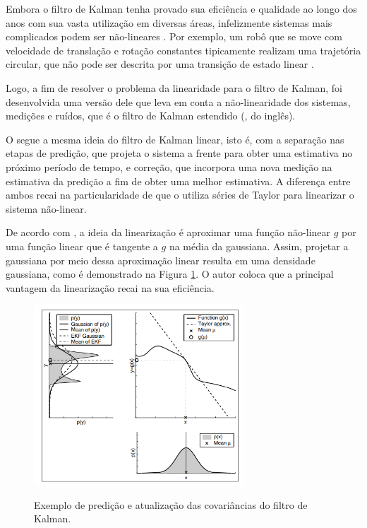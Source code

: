 \documentclass[acronym, symbols, table, deposito]{fei}
\begin{document}
			Embora o filtro de Kalman tenha provado sua eficiência e qualidade ao longo dos anos com sua vasta utilização em diversas áreas, infelizmente sistemas mais complicados podem ser não-lineares \cite{khodarahmi2023review}. Por exemplo, um robô que se move com velocidade de translação e rotação constantes tipicamente realizam uma trajetória circular, que não pode ser descrita por uma transição de estado linear \cite{thrun2002probabilistic}.
			
			Logo, a fim de resolver o problema da linearidade para o filtro de Kalman, foi desenvolvida uma versão dele que leva em conta a não-linearidade dos sistemas, medições e ruídos, que é o filtro de Kalman estendido (, do inglês).
			
			O  segue a mesma ideia do filtro de Kalman linear, isto é, com a separação nas etapas de predição, que projeta o sistema a frente para obter uma estimativa no próximo período de tempo, e correção, que incorpora uma nova medição na estimativa da predição a fim de obter uma melhor estimativa. A diferença entre ambos recai na particularidade de que o  utiliza séries de Taylor para linearizar o sistema não-linear.
			
			De acordo com \textcite{thrun2002probabilistic}, a ideia da linearização é aproximar uma função não-linear $g$ por uma função linear que é tangente a $g$ na média da gaussiana. Assim, projetar a gaussiana por meio dessa aproximação linear resulta em uma densidade gaussiana, como é demonstrado na Figura \ref{fig:ekf_linearizacao}. O autor coloca que a principal vantagem da linearização recai na sua eficiência.
			
			\begin{figure}[!htb]
				\centering
				\caption{Exemplo de predição e atualização das covariâncias do filtro de Kalman.}
				\includegraphics[width=0.7\textwidth]{figura_linearizacao_ekf.png}
				\label{fig:ekf_linearizacao}
			\end{figure}
			
\end{document}
